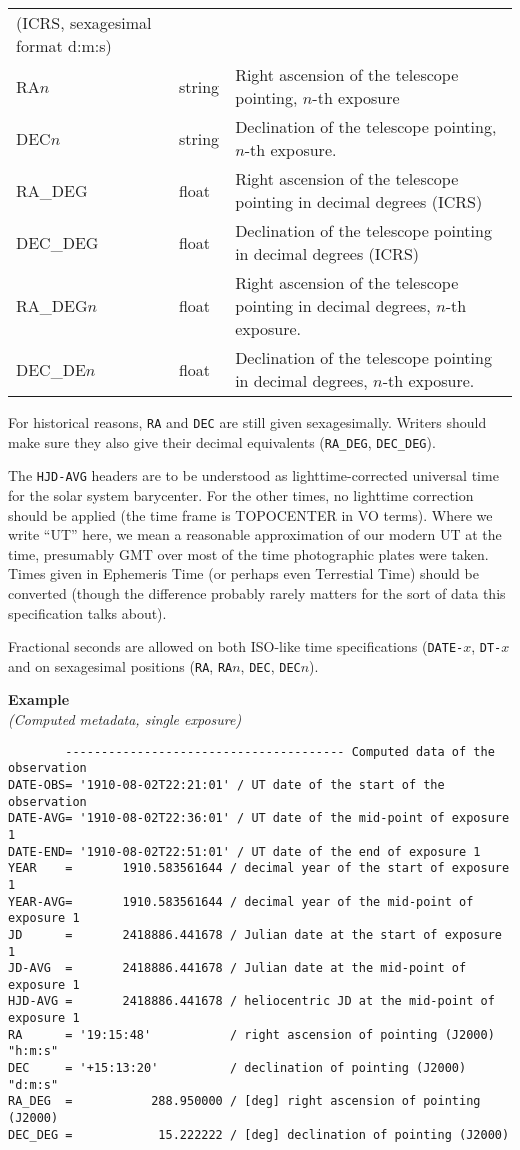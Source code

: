 \documentclass[11pt]{ivoa}
\newcommand\cardname[1]{\texttt{\color{keyword}#1}}
\newenvironment{fitsexample}[1]
{\bigskip\noindent\textbf{Example}\\\textit{(#1\smallskip)}}
{\medskip}
\begin{document}
\begin{longtable}{llp{}}
(ICRS, sexagesimal format d:m:s)\\
RA$n$     &string    & Right ascension of the telescope
pointing, $n$-th exposure\\
DEC$n$    &string    & Declination of the telescope pointing,
$n$-th exposure.\\
RA\_DEG   &float    & Right ascension of the telescope
pointing in decimal degrees (ICRS)\\
DEC\_DEG  &float    & Declination of the telescope pointing in
decimal degrees (ICRS)\\
RA\_DEG$n$&float    & Right ascension of the telescope
pointing in decimal degrees, $n$-th exposure.\\
DEC\_DE$n$&float    & Declination of the telescope pointing in
decimal degrees, $n$-th exposure.\\
\end{longtable}
\endgroup

For historical reasons, \cardname{RA} and \cardname{DEC} are still given
sexagesimally.  Writers should make sure they also give their decimal
equivalents (\cardname{RA\_DEG}, \cardname{DEC\_DEG}).

The \cardname{HJD-AVG} headers are to be understood as
lighttime-corrected universal time for the solar system barycenter.  For
the other times, no lighttime correction should be applied (the time
frame is TOPOCENTER in VO terms).  Where we write ``UT'' here, we mean a
reasonable approximation of our modern UT at the time, presumably GMT
over most of the time photographic plates were taken.  Times given in
Ephemeris Time (or perhaps even Terrestial Time) should be converted
(though the difference probably rarely matters for the sort of data this
specification talks about).

Fractional seconds are allowed on both ISO-like time specifications
(\cardname{DATE-$x$}, \cardname{DT-$x$} and on sexagesimal positions
(\cardname{RA}, \cardname{RA$n$}, \cardname{DEC}, \cardname{DEC$n$}).


\begin{fitsexample}{Computed metadata, single exposure}
\begin{lstlisting}
        --------------------------------------- Computed data of the observation
DATE-OBS= '1910-08-02T22:21:01' / UT date of the start of the observation
DATE-AVG= '1910-08-02T22:36:01' / UT date of the mid-point of exposure 1
DATE-END= '1910-08-02T22:51:01' / UT date of the end of exposure 1
YEAR    =       1910.583561644 / decimal year of the start of exposure 1
YEAR-AVG=       1910.583561644 / decimal year of the mid-point of exposure 1
JD      =       2418886.441678 / Julian date at the start of exposure 1
JD-AVG  =       2418886.441678 / Julian date at the mid-point of exposure 1
HJD-AVG =       2418886.441678 / heliocentric JD at the mid-point of exposure 1
RA      = '19:15:48'           / right ascension of pointing (J2000) "h:m:s"
DEC     = '+15:13:20'          / declination of pointing (J2000) "d:m:s"
RA_DEG  =           288.950000 / [deg] right ascension of pointing (J2000)
DEC_DEG =            15.222222 / [deg] declination of pointing (J2000)
\end{lstlisting}
\end{fitsexample}
\end{document}
